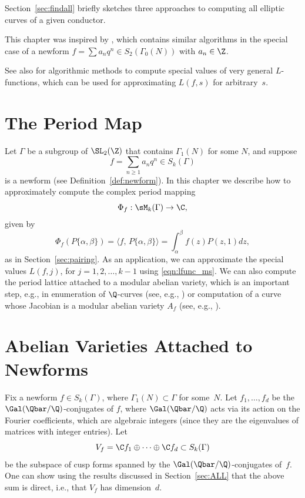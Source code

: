 Section~\ref{sec:findall} briefly sketches three approaches
to computing all elliptic curves of a given conductor.


This chapter was inspired by \cite{cremona:algs}, which contains
similar algorithms in the special case of a
newform $f=\sum a_n q^n \in S_2(\Gamma_0(N))$ with $a_n\in\Z$. 

See also \cite{dokchitser:lfun} for algorithmic methods to compute
special values of very general $L$-functions, which can be used for
approximating $L(f,s)$ for arbitrary~$s$.

\section{The Period Map}\label{sec:periodintro}
Let $\Gamma$ be a subgroup of $\SL_2(\Z)$ that contains
$\Gamma_1(N)$ for some $N$, and 
suppose
$$
  f =\sum_{n\geq 1} a_n q^n\in S_k(\Gamma)
$$
is a newform (see Definition~\ref{def:newform}).
In this chapter we describe how to approximately 
compute the complex period mapping
$$
   \Phi_f : \sM_k(\Gamma) \to \C,
$$
given by 
$$
  \Phi_f(P\{\alpha,\beta\}) = \langle f,\, P\{\alpha,\beta\} \rangle
  = \int_{\alpha}^{\beta} f(z) P(z,1) d z,
$$
as in Section~\ref{sec:pairing}.  As an application, we can
approximate the special values $L(f,j)$, for $j=1,2,\ldots, k-1$ using
\eqref{eqn:lfunc_ms}.  We can also
compute the period lattice attached to a modular abelian variety,
which is an important step, e.g., in enumeration of 
$\Q$-curves (see, e.g., \cite{gonz_lario_quer}) or computation of 
a curve whose Jacobian is a modular abelian variety $A_f$
(see, e.g., \cite{wang:factors}).



\section{Abelian Varieties Attached to Newforms}
\label{sec:newformabvar}
Fix a newform $f\in S_k(\Gamma)$, where $\Gamma_1(N)\subset \Gamma$
for some~$N$.  Let $f_1,\ldots, f_d$ be the
$\Gal(\Qbar/\Q)$-conjugates of $f$, where $\Gal(\Qbar/\Q)$ acts via
its action on the Fourier coefficients, which are algebraic integers
(since they are the eigenvalues of matrices with integer entries).
Let
\begin{equation}\label{eqn:vf}
  V_f = \C f_1 \oplus \cdots \oplus \C f_d \subset S_k(\Gamma)
\end{equation}
be the subspace of cusp forms spanned by the 
$\Gal(\Qbar/\Q)$-conjugates of~$f$.
One can show using the results discussed in Section~\ref{sec:ALL}
that the above sum is direct, i.e., that $V_f$ has dimension~$d$.

